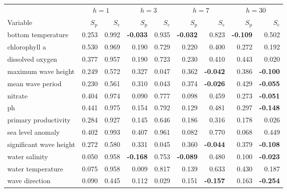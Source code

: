 \begin{tabular}{l rr rr rr rr}
\toprule
 & \multicolumn{2}{c}{$h=1$} & \multicolumn{2}{c}{$h=3$} & \multicolumn{2}{c}{$h=7$} & \multicolumn{2}{c}{$h=30$} \\
\cmidrule(lr){2-3}\cmidrule(lr){4-5}\cmidrule(lr){6-7}\cmidrule(lr){8-9}
Variable & $S_{\mathrm{p}}$ & $S_{\mathrm{c}}$ & $S_{\mathrm{p}}$ & $S_{\mathrm{c}}$ & $S_{\mathrm{p}}$ & $S_{\mathrm{c}}$ & $S_{\mathrm{p}}$ & $S_{\mathrm{c}}$ \\
\midrule
bottom temperature & 0.253 & 0.992 & \textbf{-0.033} & 0.935 & \textbf{-0.032} & 0.823 & \textbf{-0.109} & 0.502 \\
chlorophyll a & 0.530 & 0.969 & 0.190 & 0.729 & 0.220 & 0.400 & 0.272 & 0.192 \\
dissolved oxygen & 0.377 & 0.957 & 0.190 & 0.723 & 0.230 & 0.410 & 0.443 & 0.020 \\
maximum wave height & 0.249 & 0.572 & 0.327 & 0.047 & 0.362 & \textbf{-0.042} & 0.386 & \textbf{-0.100} \\
mean wave period & 0.230 & 0.561 & 0.310 & 0.043 & 0.374 & \textbf{-0.026} & 0.429 & \textbf{-0.055} \\
nitrate & 0.404 & 0.974 & 0.090 & 0.777 & 0.098 & 0.459 & 0.273 & \textbf{-0.051} \\
ph & 0.441 & 0.975 & 0.154 & 0.792 & 0.129 & 0.481 & 0.297 & \textbf{-0.148} \\
primary productivity & 0.284 & 0.927 & 0.145 & 0.646 & 0.186 & 0.316 & 0.178 & 0.026 \\
sea level anomaly & 0.402 & 0.993 & 0.407 & 0.961 & 0.082 & 0.770 & 0.068 & 0.449 \\
significant wave height & 0.272 & 0.580 & 0.331 & 0.045 & 0.360 & \textbf{-0.044} & 0.379 & \textbf{-0.108} \\
water salinity & 0.050 & 0.958 & \textbf{-0.168} & 0.753 & \textbf{-0.089} & 0.480 & 0.100 & \textbf{-0.023} \\
water temperature & 0.075 & 0.958 & 0.009 & 0.817 & 0.139 & 0.633 & 0.430 & 0.187 \\
wave direction & 0.090 & 0.445 & 0.112 & 0.029 & 0.151 & \textbf{-0.157} & 0.163 & \textbf{-0.254} \\
\bottomrule
\end{tabular}